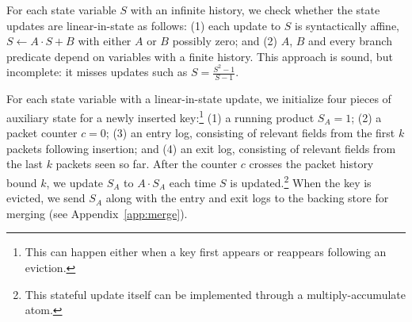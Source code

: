 %

 For each
state variable $S$ with an infinite history, we check whether the state updates
are linear-in-state as follows: (1) each update to $S$ is syntactically affine,
\ie $S \gets A \cdot S + B$ with either $A$ or $B$ possibly zero; and (2) $A$,
$B$ and every branch predicate depend on variables with a finite history. This
approach is sound, but incomplete: it misses updates such as $S = \frac{S^2 -
1}{S - 1}$.

 For each state variable with a
linear-in-state update, we initialize four pieces of auxiliary state for a
newly inserted key:\footnote{This can happen either when a key first appears or
reappears following an eviction.} (1) a running product $S_A = 1$; (2) a packet
counter $c = 0$; (3) an entry log, consisting of relevant fields from the first
$k$ packets following insertion; and (4) an exit log, consisting of relevant
fields from the last $k$ packets seen so far.  After the counter $c$ crosses
the packet history bound $k$, we update $S_A$ to $A \cdot S_A$ each time $S$ is
updated.\footnote{This stateful update itself can be implemented through a
multiply-accumulate atom.} When the key is evicted, we send $S_A$ along with
the entry and exit logs to the backing store for merging (see Appendix~\ref{app:merge}).
